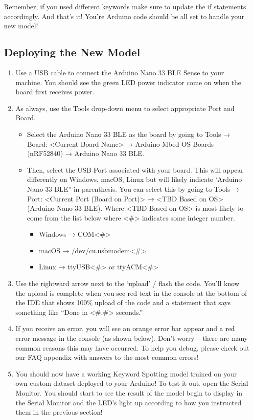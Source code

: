     Remember, if you used different keywords make sure to update the if statements accordingly. And that’s it! You’re Arduino code should be all set to handle your new model!
    
\subsection{Deploying the New Model}

\begin{enumerate}
  \item   Use a USB cable to connect the Arduino Nano 33 BLE Sense to your machine. You should see the green LED power indicator come on when the board first receives power.
  
  \item   As always, use the Tools drop-down menu to select appropriate Port and Board.
    \begin{itemize}
      \item Select the Arduino Nano 33 BLE as the board by going to Tools → Board: <Current Board Name> → Arduino Mbed OS Boards (nRF52840) → Arduino Nano 33 BLE.

      \item Then, select the USB Port associated with your board. This will appear differently on Windows, macOS, Linux but will likely indicate ‘Arduino Nano 33 BLE” in parenthesis. You can select this by going to Tools → Port: <Current Port (Board on Port)> → <TBD Based on OS> (Arduino Nano 33 BLE). Where <TBD Based on OS> is most likely to come from the list below where <\#> indicates some integer number.
        \begin{itemize}
          \item Windows → COM<\#>
          \item macOS → /dev/cu.usbmodem<\#>
          \item Linux → ttyUSB<\#> or ttyACM<\#>
        \end{itemize}
      \end{itemize}

  \item   Use the rightward arrow next to the ‘upload’ / flash the code. You’ll know the upload is complete when you see red text in the console at the bottom of the IDE that shows 100\% upload of the code and a statement that says something like “Done in <\#.\#> seconds.”

  \item If you receive an error, you will see an orange error bar appear and a red error message in the console (as shown below). Don’t worry -- there are many common reasons this may have occurred. To help you debug, please check out our FAQ appendix with answers to the most common errors!

  \item You should now have a working Keyword Spotting model trained on your own custom dataset deployed to your Arduino! To test it out, open the Serial Monitor. You should start to see the result of the model begin to display in the Serial Monitor and the LED’s light up according to how you instructed them in the previous section!
\end{enumerate}    
 
